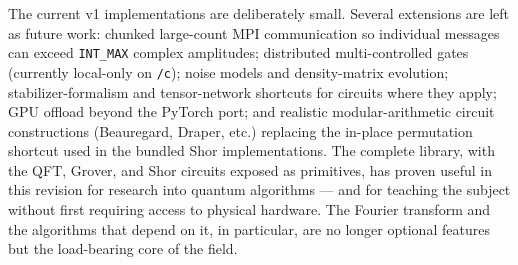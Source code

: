The current v1 implementations are deliberately small. Several extensions are left as future work: chunked large-count MPI communication so individual messages can exceed \texttt{INT\_MAX} complex amplitudes; distributed multi-controlled gates (currently local-only on \texttt{/c}); noise models and density-matrix evolution; stabilizer-formalism and tensor-network shortcuts for circuits where they apply; GPU offload beyond the PyTorch port; and realistic modular-arithmetic circuit constructions (Beauregard, Draper, etc.) replacing the in-place permutation shortcut used in the bundled Shor implementations. The complete library, with the QFT, Grover, and Shor circuits exposed as primitives, has proven useful in this revision for research into quantum algorithms --- and for teaching the subject without first requiring access to physical hardware. The Fourier transform and the algorithms that depend on it, in particular, are no longer optional features but the load-bearing core of the field.
